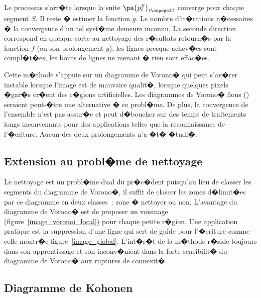 Le processus s'arr�te lorsque la suite $\pa{p^S_t}_{t\supegal 0}$ converge pour chaque segment $S$. Il reste � estimer la fonction $g$. Le nombre d'it�rations n�cessaires � la convergence d'un tel syst�me demeure inconnu. La seconde direction correspond en quelque sorte au nettoyage des r�sultats retourn�s par la fonction $f$ (ou son prolongement $g$), les lignes presque achev�es sont compl�t�es, les bouts de lignes ne menant � rien sont effac�es. 

Cette m�thode s'appuie sur un diagramme de Vorono� qui peut s'av�rer instable lorsque l'image est de mauvaise qualit�, lorsque quelques pixels �gar�s cr�ent des r�gions artificielles. Les diagrammes de Vorono� flous () seraient peut-�tre une alternative � ce probl�me. De plus, la convergence de l'ensemble n'est pas assur�e et peut d�boucher sur des temps de traitements longs inconvenants pour des applications telles que la reconnaissance de l'�criture. Aucun des deux prolongements n'a �t� �tudi�.
            
            





\subsection{Extension au probl�me de nettoyage}


Le nettoyage est un probl�me dual du pr�c�dent puisqu'au lieu de classer les segments du diagramme de Vorono�, il suffit de classer les zones d�limit�es par ce diagramme en deux classes~: zone � nettoyer ou non. L'avantage du diagramme de Vorono� est de proposer un voisinage (figure~\ref{image_voronoi_local}) pour chaque petite r�gion. Une application pratique est la suppression d'une ligne qui sert de guide pour l'�criture comme celle montr�e figure~\ref{image_global}. L'int�r�t de la m�thode r�side toujours dans son apprentissage et son inconv�nient dans la forte sensibilit� du diagramme de Vorono� aux ruptures de connexit�.







\subsection{Diagramme de Kohonen}

